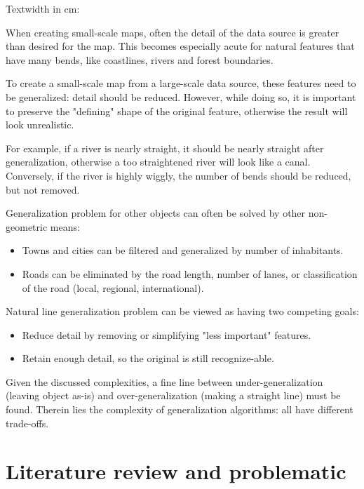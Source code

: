 \documentclass[a4paper]{article}
\begin{document}
Textwidth in cm: {\prntlen{\textwidth}}
\fi

When creating small-scale maps, often the detail of the data source is greater
than desired for the map. This becomes especially acute for natural features
that have many bends, like coastlines, rivers and forest boundaries.

To create a small-scale map from a large-scale data source, these features need
to be generalized: detail should be reduced. However, while doing so, it is
important to preserve the "defining" shape of the original feature, otherwise
the result will look unrealistic.

For example, if a river is nearly straight, it should be nearly straight after
generalization, otherwise a too straightened river will look like a canal.
Conversely, if the river is highly wiggly, the number of bends should be
reduced, but not removed.

Generalization problem for other objects can often be solved by other
non-geometric means:

\begin{itemize}
    \item Towns and cities can be filtered and generalized by number of
        inhabitants.
    \item Roads can be eliminated by the road length, number of lanes, or
        classification of the road (local, regional, international).
\end{itemize}

Natural line generalization problem can be viewed as having two competing
goals:

\begin{itemize}
    \item Reduce detail by removing or simplifying "less important" features.
    \item Retain enough detail, so the original is still recognize-able.
\end{itemize}

Given the discussed complexities, a fine line between under-generalization
(leaving object as-is) and over-generalization (making a straight line) must be
found. Therein lies the complexity of generalization algorithms: all have
different trade-offs.

\section{Literature review and problematic}
\label{sec:literature-review}
\end{document}
